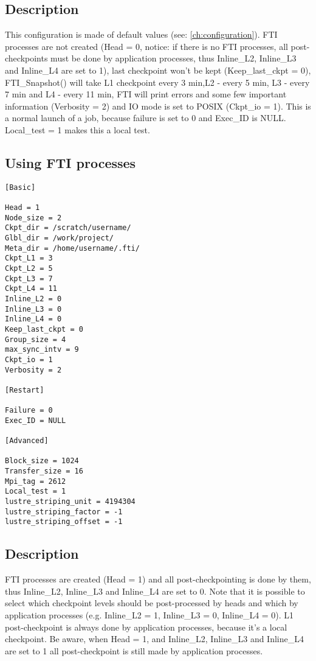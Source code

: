\documentclass{refrep}
\begin{document}
\subsection*{Description}
This configuration is made of default values (see: \ref{ch:configuration}). FTI processes are not created (Head = 0, notice: if there is no FTI processes, all post-checkpoints must be done by application processes, thus Inline\_L2, Inline\_L3 and Inline\_L4 are set to 1), last checkpoint won't be kept (Keep\_last\_ckpt = 0), FTI\_Snapshot() will take L1 checkpoint every 3 min,L2 - every 5 min, L3 - every 7 min and L4 - every 11 min, FTI will print errors and some few important information (Verbosity = 2) and IO mode is set to POSIX (Ckpt\_io = 1). This is a normal launch of a job, because failure is set to 0 and Exec\_ID is NULL. Local\_test = 1 makes this a local test.
\newpage
\subsection{Using FTI processes}\label{subsec:configftiprocces}
\begin{center}
\begin{lstlisting}[frame=single]
[Basic]

Head = 1
Node_size = 2
Ckpt_dir = /scratch/username/
Glbl_dir = /work/project/
Meta_dir = /home/username/.fti/
Ckpt_L1 = 3
Ckpt_L2 = 5
Ckpt_L3 = 7
Ckpt_L4 = 11
Inline_L2 = 0
Inline_L3 = 0
Inline_L4 = 0
Keep_last_ckpt = 0
Group_size = 4
max_sync_intv = 9
Ckpt_io = 1
Verbosity = 2

[Restart]

Failure = 0
Exec_ID = NULL

[Advanced]

Block_size = 1024
Transfer_size = 16
Mpi_tag = 2612
Local_test = 1
lustre_striping_unit = 4194304 
lustre_striping_factor = -1 
lustre_striping_offset = -1 

\end{lstlisting}
\end{center}
\subsection*{Description}
FTI processes are created (Head = 1) and all post-checkpointing is done by them, thus Inline\_L2, Inline\_L3 and Inline\_L4 are set to 0. Note that it is possible to select which checkpoint levels should be post-processed by heads and which by application processes (e.g. Inline\_L2 = 1, Inline\_L3 = 0, Inline\_L4 = 0). L1 post-checkpoint is always done by application processes, because it's a local checkpoint. Be aware, when Head = 1, and Inline\_L2, Inline\_L3 and Inline\_L4 are set to 1 all post-checkpoint is still made by application processes.
\newpage
\end{document}
